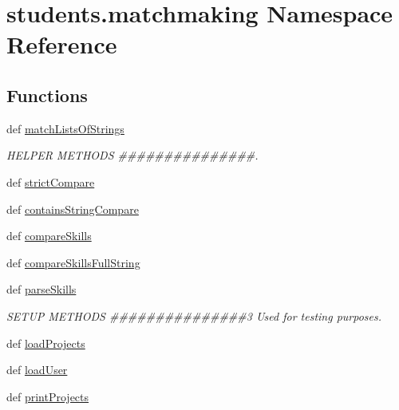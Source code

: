 \hypertarget{namespacestudents_1_1matchmaking}{\section{students.\-matchmaking Namespace Reference}
\label{namespacestudents_1_1matchmaking}
}
\subsection*{Functions}
\begin{DoxyCompactItemize}
\item 
def \hyperlink{namespacestudents_1_1matchmaking_af3e519980cd77aceb9fe2a6843ed0eac}{match\-Lists\-Of\-Strings}
\begin{DoxyCompactList}\small\item\em H\-E\-L\-P\-E\-R M\-E\-T\-H\-O\-D\-S \#\#\#\#\#\#\#\#\#\#\#\#\#\#\#. \end{DoxyCompactList}\item 
def \hyperlink{namespacestudents_1_1matchmaking_a4f0b4f490749d746a5c6c710e65214c6}{strict\-Compare}
\item 
def \hyperlink{namespacestudents_1_1matchmaking_a839ce39a9ca3f80d43e51e190d5bf4a4}{contains\-String\-Compare}
\item 
def \hyperlink{namespacestudents_1_1matchmaking_aa3c57417f509579aa72e905cc90bac71}{compare\-Skills}
\item 
def \hyperlink{namespacestudents_1_1matchmaking_a48857c2224c4e283e8745d574b6ab63d}{compare\-Skills\-Full\-String}
\item 
def \hyperlink{namespacestudents_1_1matchmaking_aac73f2cefa7cada176cc1d3896416edc}{parse\-Skills}
\begin{DoxyCompactList}\small\item\em S\-E\-T\-U\-P M\-E\-T\-H\-O\-D\-S \#\#\#\#\#\#\#\#\#\#\#\#\#\#\#3 Used for testing purposes. \end{DoxyCompactList}\item 
def \hyperlink{namespacestudents_1_1matchmaking_a856d112aa07868c6024c35cd0a90c24c}{load\-Projects}
\item 
def \hyperlink{namespacestudents_1_1matchmaking_aa36aaf3aef1354180f31305846591946}{load\-User}
\item 
def \hyperlink{namespacestudents_1_1matchmaking_a3f28ed62649ae8f076cebb31d838a64a}{print\-Projects}
\end{DoxyCompactItemize}
